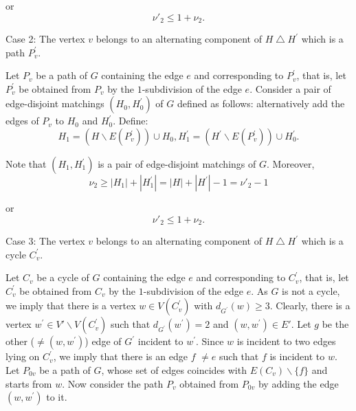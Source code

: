 \documentclass[fleqn,12pt,twoside]{article}
\newenvironment{proof}[1][Proof.]{\begin{trivlist}
\item[\hskip \labelsep {\bfseries #1}]}{\end{trivlist}}
\begin{document}
\begin{proof}
or\begin{equation*}
\nu' _{2}\leq 1+\nu _{2}.
\end{equation*}

Case 2: The vertex $v$ belongs to an alternating component of $H\bigtriangleup H^{\prime }$ which is a path $P_{v}^{\prime }$.

Let $P_{v}$ be a path of $G$ containing the edge $e$ and corresponding to $P_{v}^{\prime }$, that is, let $P_{v}^{\prime }$ be obtained from
$P_{v}$ by the $1$-subdivision of the edge $e$. Consider a pair of
edge-disjoint matchings $(H_{0},H_{0}^{\prime })$ of $G$ defined as
follows: alternatively
add the edges of $P_{v}$ to $H_{0}$ and $H_{0}^{\prime }$. Define:\begin{equation*}
H_{1}=(H\backslash E(P_{v}^{\prime }))\cup H_{0},H_{1}^{\prime
}=(H^{\prime }\backslash E(P_{v}^{\prime }))\cup H_{0}^{\prime }.
\end{equation*}

Note that $(H_{1},H_{1}^{\prime })$ is a pair of edge-disjoint matchings of $G$. Moreover,\begin{equation*}
\nu _{2}\geq \left\vert H_{1}\right\vert +\left\vert H_{1}^{\prime
}\right\vert =\left\vert H\right\vert +\left\vert H^{\prime
}\right\vert -1=\nu' _{2}-1
\end{equation*}

or\begin{equation*}
\nu' _{2}\leq 1+\nu _{2}.
\end{equation*}

Case 3: The vertex $v$ belongs to an alternating component of $H\bigtriangleup H^{\prime }$ which is a cycle $C_{v}^{\prime }$.

Let $C_{v}$ be a cycle of $G$ containing the edge $e$ and corresponding to $C_{v}^{\prime }$, that is, let $C_{v}^{\prime }$ be obtained from
$C_{v}$ by the $1$-subdivision of the edge $e$. As $G$ is not a
cycle, we imply that there is a vertex $w\in V(C_{v}^{\prime })$
with $d_{G^{\prime }}(w)\geq 3$. Clearly, there is a vertex
$w^{\prime }\in V'\backslash
V(C_{v}^{\prime })$ such that $d_{G^{\prime }}(w^{\prime })=2$ and $(w,w^{\prime })\in E'$. Let $g$ be the other ($\neq (w,w^{\prime
})$) edge of $G^{\prime }$ incident to $w^{\prime }$. Since $w$ is
incident
to two edges lying on $C_{v}^{\prime }$, we imply that there is an edge $f$ $\neq e$ such that $f$ is incident to $w$. Let $P_{0v}$ be a path of
$G$, whose set of edges coincides with $E(C_{v})\backslash \{f\}$
and starts from $w$. Now consider the path $P_{v}$ obtained from
$P_{0v}$ by adding the edge $(w,w^{\prime })$ to it.


\end{proof}
\end{document}
